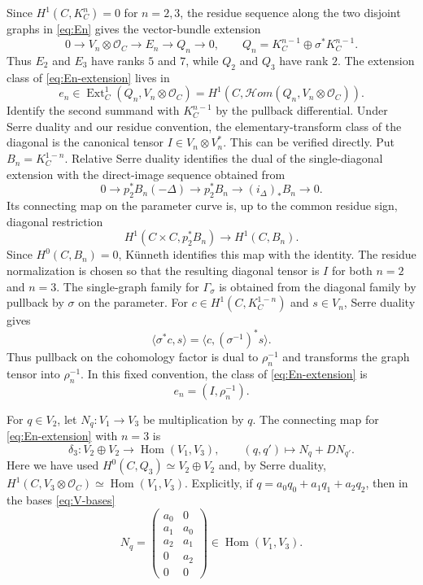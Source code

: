 \documentclass[11pt,a4paper,dvipsnames]{amsart}
\numberwithin{equation}{section}
\theoremstyle{plain}
\theoremstyle{definition}
\newcommand{\cO}{\mathcal O}
\newcommand{\Hom}{\operatorname{Hom}}
\newcommand{\cHom}{\mathcal{H}om}
\begin{document}
Since $H^1(C,K_C^n)=0$ for $n=2,3$, the residue sequence along
the two disjoint graphs in \eqref{eq:En} gives the vector-bundle extension
\begin{equation}\label{eq:En-extension}
0\longrightarrow V_n\otimes\cO_C
\longrightarrow E_n
\longrightarrow Q_n\longrightarrow0,
\qquad
Q_n=K_C^{n-1}\oplus\sigma^*K_C^{n-1}.
\end{equation}
Thus $E_2$ and $E_3$ have ranks $5$ and $7$, while $Q_2$ and $Q_3$ have
rank $2$.  The extension class of \eqref{eq:En-extension} lives in
\begin{equation}\label{eq:en-class-target}
 e_n\in
 \operatorname{Ext}^1_C(Q_n,V_n\otimes\cO_C)
 =H^1\!\left(C,\cHom(Q_n,V_n\otimes\cO_C)\right).
\end{equation}
Identify the second summand with $K_C^{n-1}$ by the pullback differential.
Under Serre duality and our residue convention, the elementary-transform
class of the diagonal is the canonical tensor $I\in V_n\otimes V_n^*$.
This can be verified directly.  Put $B_n=K_C^{1-n}$.  Relative Serre
duality identifies the dual of the single-diagonal extension with the
direct-image sequence obtained from
$$
 0\longrightarrow p_2^*B_n(-\Delta)
 \longrightarrow p_2^*B_n
 \longrightarrow (i_\Delta)_*B_n\longrightarrow0.
$$
Its connecting map on the parameter curve is, up to the common residue
sign, diagonal restriction
$$
 H^1(C\times C,p_2^*B_n)\longrightarrow H^1(C,B_n).
$$
Since $H^0(C,B_n)=0$, K\"unneth identifies this map with the identity.
The residue normalization is chosen so that the resulting diagonal
tensor is $I$ for both $n=2$ and $n=3$.
The single-graph family for $\Gamma_\sigma$ is obtained from the diagonal
family by pullback by $\sigma$ on the parameter.  For
$c\in H^1(C,K_C^{1-n})$ and $s\in V_n$, Serre duality gives
$$
 \langle\sigma^*c,s\rangle
 =\langle c,(\sigma^{-1})^*s\rangle.
$$
Thus pullback on the cohomology factor is dual to $\rho_n^{-1}$ and
transforms the graph tensor into $\rho_n^{-1}$.
In this fixed convention, the class of \eqref{eq:En-extension} is
\begin{equation}\label{eq:en-class}
 e_n=(I,\rho_n^{-1}).
\end{equation}

For $q\in V_2$, let $N_q:V_1\to V_3$ be multiplication by $q$.  The
connecting map for \eqref{eq:En-extension} with $n=3$ is
\begin{equation}\label{eq:delta3}
 \delta_3:V_2\oplus V_2\longrightarrow\Hom(V_1,V_3),
 \qquad
 (q,q')\longmapsto N_q+DN_{q'}.
\end{equation}
Here we have used
$H^0(C,Q_3)\simeq V_2\oplus V_2$ and, by Serre duality,
$H^1(C,V_3\otimes\cO_C)\simeq\Hom(V_1,V_3)$.
Explicitly, if $q=a_0q_0+a_1q_1+a_2q_2$, then in the bases
\eqref{eq:V-bases}
\begin{equation}\label{eq:Nq-matrix}
 N_q=
 \begin{pmatrix}
  a_0&0\\
  a_1&a_0\\
  a_2&a_1\\
  0&a_2\\
  0&0
 \end{pmatrix}
 \in\Hom(V_1,V_3).
\end{equation}
\end{document}
